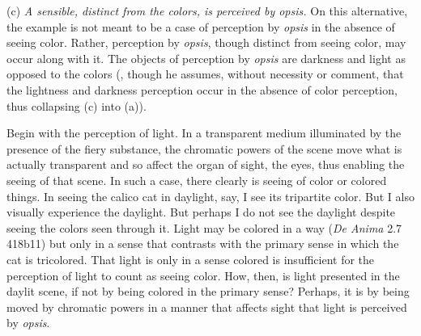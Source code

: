 (c) \emph{A sensible, distinct from the colors, is perceived by \emph{opsis}.} On this alternative, the example is not meant to be a case of perception by \emph{opsis} in the absence of seeing color. Rather, perception by \emph{opsis}, though distinct from seeing color, may occur along with it. The objects of perception by \emph{opsis} are darkness and light as opposed to the colors (\citealt[249–50]{Johansen:2005hz}, though he assumes, without necessity or comment, that the lightness and darkness perception occur in the absence of color perception, thus collapsing (c) into (a)). 

Begin with the perception of light. In a transparent medium illuminated by the presence of the fiery substance, the chromatic powers of the scene move what is actually transparent and so affect the organ of sight, the eyes, thus enabling the seeing of that scene. In such a case, there clearly is seeing of color or colored things. In seeing the calico cat in daylight, say, I see its tripartite color. But I also visually experience the daylight. But perhaps I do not see the daylight despite seeing the colors seen through it. Light may be colored in a way (\emph{De Anima} 2.7 418b11) but only in a sense that contrasts with the primary sense in which the cat is tricolored. That light is only in a sense colored is insufficient for the perception of light to count as seeing color. How, then, is light presented in the daylit scene, if not by being colored in the primary sense? Perhaps, it is by being moved by chromatic powers in a manner that affects sight that light is perceived by \emph{opsis}.


